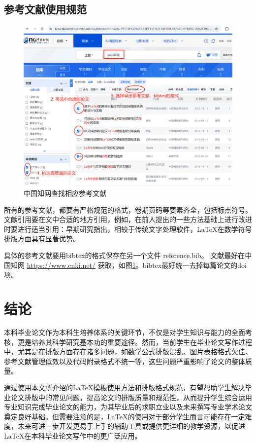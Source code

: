 \documentclass{JYU} %
\begin{document}
\subsection{参考文献使用规范}
\begin{figure}[!htbp]
	\centering
	\includegraphics[width=1.0\textwidth]{./图片/论文图片/fig_cnki.png}
	\caption{中国知网查找相应参考文献}\label{fig_cnki}
\end{figure}

所有的参考文献，都要有严格规范的格式，卷期页码等要素齐全，包括标点符号。
文献引用要在文中合适的地方引用，例如，在前人提出的一些方法基础上进行改进时要进行适当引用：早期研究指出，相较于传统文字处理软件，\LaTeX{}在数学符号排版方面具有显著优势\cite{KJYU201010018}。

具体的参考文献要用bibtex的格式保存在另一个文件 reference.bib。
文献最好在中国知网 \href{https://www.cnki.net/}{https://www.cnki.net/} 获取，如图\ref{fig_cnki}。bibtex最好统一去掉每篇论文的doi项。


\section{结论}
本科毕业论文作为本科生培养体系的关键环节，不仅是对学生知识与能力的全面考核，更是培养其科学研究基本功的重要途径。然而，当前学生在毕业论文写作过程中，尤其是在排版方面存在诸多问题，如数学公式排版混乱、图片表格格式欠佳、参考文献管理低效以及代码附录格式不统一等，这些问题严重影响了论文的整体质量。

通过使用本文所介绍的\LaTeX 模板使用方法和排版格式规范，有望帮助学生解决毕业论文排版中的常见问题，提高论文的排版质量和规范性，从而提升学生综合运用专业知识完成毕业论文的能力，为其毕业后的求职立业以及未来撰写专业学术论文奠定良好基础。但需要注意的是，\LaTeX 的使用对于部分学生而言可能存在一定难度，未来可进一步开发更易于上手的辅助工具或提供更详细的教学资源，以促进\LaTeX 在本科毕业论文写作中的更广泛应用。 
\end{document}
